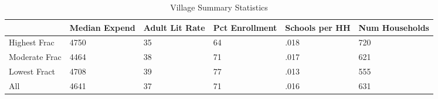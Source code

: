 \begin{table}[htbp]
\caption{\label{vsummary} Village Summary Statistics}\centering\medskip
\begin{tabular}{|l|l|l|l|l|l|}\hline  
 & Median Expend  & Adult Lit Rate  & Pct Enrollment  & Schools per HH  & Num Households  \\ \hline  
Highest Frac &      4750 &        35 &        64 &      .018 &       720 \\ \hline 
Moderate Frac &      4464 &        38 &        71 &      .017 &       621 \\ \hline 
Lowest Fract &      4708 &        39 &        77 &      .013 &       555 \\ \hline 
All &      4641 &        37 &        71 &      .016 &       631 \\ \hline 
  \end{tabular}
\end{table}
